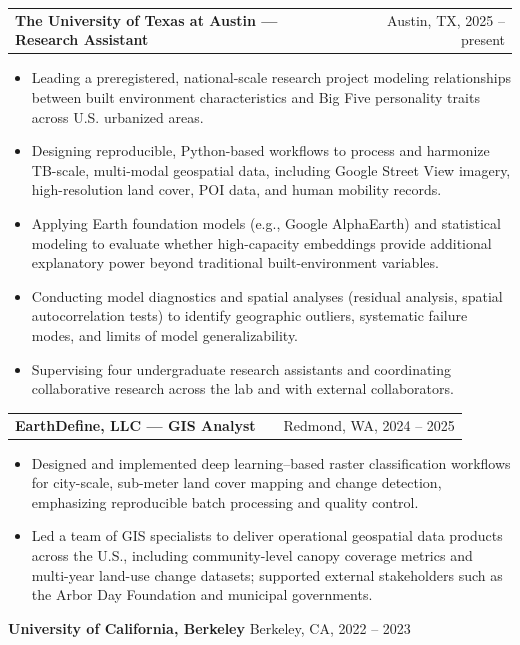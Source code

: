 \documentclass[a4paper,12pt]{article}
\makeatletter
\newenvironment{joblong}[2]
{
\begin{tabularx}{\linewidth}{@{}l X r@{}}
\textbf{#1} & \hfill &  #2 \\[3.75pt]
\end{tabularx}
\begin{minipage}[t]{\linewidth}
\begin{itemize}[nosep,after=\strut,leftmargin=1.2em,itemsep=3pt,label=--]
}
{
\end{itemize}
\end{minipage}
}
\makeatother
\begin{document}
\begin{joblong}{The University of Texas at Austin --- Research Assistant}{Austin, TX, 2025 -- present}
\item Leading a preregistered, national-scale research project modeling relationships between built environment characteristics and Big Five personality traits across U.S. urbanized areas.
\item Designing reproducible, Python-based workflows to process and harmonize TB-scale, multi-modal geospatial data, including Google Street View imagery, high-resolution land cover, POI data, and human mobility records.
\item Applying Earth foundation models (e.g., Google AlphaEarth) and statistical modeling to evaluate whether high-capacity embeddings provide additional explanatory power beyond traditional built-environment variables.
\item Conducting model diagnostics and spatial analyses (residual analysis, spatial autocorrelation tests) to identify geographic outliers, systematic failure modes, and limits of model generalizability.
\item Supervising four undergraduate research assistants and coordinating collaborative research across the lab and with external collaborators.
\end{joblong}


\begin{joblong}{EarthDefine, LLC --- GIS Analyst}{Redmond, WA, 2024 -- 2025}
\item Designed and implemented deep learning–based raster classification workflows for city-scale, sub-meter land cover mapping and change detection, emphasizing reproducible batch processing and quality control.
\item Led a team of GIS specialists to deliver operational geospatial data products across the U.S., including community-level canopy coverage metrics and multi-year land-use change datasets; supported external stakeholders such as the Arbor Day Foundation and municipal governments.
\end{joblong}

\textbf{University of California, Berkeley} \hfill Berkeley, CA, 2022 -- 2023 \\
\vspace{-18pt}
\end{document}
